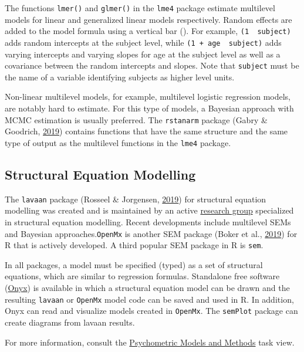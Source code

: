 \documentclass[doc,floatsintext]{apa6}
\begin{document}
The functions \texttt{lmer()} and \texttt{glmer()} in the \texttt{lme4}
package estimate multilevel models for linear and generalized linear
models respectively. Random effects are added to the model formula using
a vertical bar (\texttt{\textbar{}}). For example,
\texttt{(1\ \textbar{}\ subject)} adds random intercepts at the subject
level, while \texttt{(1\ +\ age\ \textbar{}\ subject)} adds varying
intercepts and varying slopes for age at the subject level as well as a
covariance between the random intercepts and slopes. Note that
\texttt{subject} must be the name of a variable identifying subjects as
higher level units.

Non-linear multilevel models, for example, multilevel logistic
regression models, are notably hard to estimate. For this type of
models, a Bayesian approach with MCMC estimation is usually preferred.
The \texttt{rstanarm} package (Gabry \& Goodrich,
\protect\hyperlink{ref-R-rstanarm}{2019}) contains functions that have
the same structure and the same type of output as the multilevel
functions in the \texttt{lme4} package.

\subsection{Structural Equation Modelling}\label{sem}

The \texttt{lavaan} package (Rosseel \& Jorgensen,
\protect\hyperlink{ref-R-lavaan}{2019}) for structural equation
modelling was created and is maintained by an active
\href{http://lavaan.ugent.be/}{research group} specialized in structural
equation modelling. Recent developments include multilevel SEMs and
Bayesian approaches.\texttt{OpenMx} is another SEM package (Boker et
al., \protect\hyperlink{ref-R-OpenMx}{2019}) for R that is actively
developed. A third popular SEM package in R is \texttt{sem}.

In all packages, a model must be specified (typed) as a set of
structural equations, which are similar to regression formulas.
Standalone free software (\href{http://onyx.brandmaier.de/}{Onyx}) is
available in which a structural equation model can be drawn and the
resulting \texttt{lavaan} or \texttt{OpenMx} model code can be saved and
used in R. In addition, Onyx can read and visualize models created in
\texttt{OpenMx}. The \texttt{semPlot} package can create diagrams from
lavaan results.

For more information, consult the
\href{https://cran.r-project.org/web/views/Psychometrics.html}{Psychometric
Models and Methods} task view.
\end{document}
